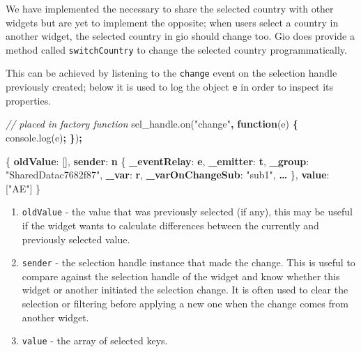 \documentclass[
  10pt,
]{krantz}
\makeatletter
\newenvironment{Shaded}{\begin{snugshade}}{\end{snugshade}}
\newcommand{\AttributeTok}[1]{\textcolor[rgb]{0.61,0.61,0.61}{#1}}
\newcommand{\CommentTok}[1]{\textcolor[rgb]{0.37,0.37,0.37}{\textit{#1}}}
\newcommand{\ErrorTok}[1]{\textcolor[rgb]{0.14,0.14,0.14}{\textbf{#1}}}
\newcommand{\FunctionTok}[1]{\textcolor[rgb]{0,0,0}{#1}}
\newcommand{\KeywordTok}[1]{\textcolor[rgb]{0.27,0.27,0.27}{\textbf{#1}}}
\newcommand{\NormalTok}[1]{#1}
\newcommand{\OperatorTok}[1]{\textcolor[rgb]{0.43,0.43,0.43}{\textbf{#1}}}
\newcommand{\OtherTok}[1]{\textcolor[rgb]{0.37,0.37,0.37}{#1}}
\newcommand{\StringTok}[1]{\textcolor[rgb]{0.5,0.5,0.5}{#1}}
\newcommand{\VariableTok}[1]{\textcolor[rgb]{0,0,0}{#1}}
\providecommand{\tightlist}{%
  \setlength{\itemsep}{0pt}\setlength{\parskip}{0pt}}
\newenvironment{kframe}{%
\medskip{}
\setlength{\fboxsep}{.8em}
 \def\at@end@of@kframe{}%
 \ifinner\ifhmode%
  \def\at@end@of@kframe{\end{minipage}}%
  \begin{minipage}{\columnwidth}%
 \fi\fi%
 \def\FrameCommand##1{\hskip\@totalleftmargin \hskip-\fboxsep
 \colorbox{shadecolor}{##1}\hskip-\fboxsep
     \hskip-\linewidth \hskip-\@totalleftmargin \hskip\columnwidth}%
 \MakeFramed {\advance\hsize-\width
   \@totalleftmargin\z@ \linewidth\hsize
   \@setminipage}}%
 {\par\unskip\endMakeFramed%
 \at@end@of@kframe}
\renewenvironment{Shaded}{\begin{kframe}}{\end{kframe}}
\makeatother
\begin{document}
We have implemented the necessary to share the selected country with other widgets but are yet to implement the opposite; when users select a country in another widget, the selected country in gio should change too. Gio does provide a method called \texttt{switchCountry} to change the selected country programmatically.

This can be achieved by listening to the \texttt{change} event on the selection handle previously created; below it is used to log the object \texttt{e} in order to inspect its properties.

\begin{Shaded}
\begin{Highlighting}[]
\CommentTok{// placed in factory function}
\VariableTok{sel\_handle}\NormalTok{.}\AttributeTok{on}\NormalTok{(}\StringTok{"change"}\OperatorTok{,} \KeywordTok{function}\NormalTok{(e) }\OperatorTok{\{}
  \VariableTok{console}\NormalTok{.}\AttributeTok{log}\NormalTok{(e)}\OperatorTok{;}
\OperatorTok{\}}\NormalTok{)}\OperatorTok{;}
\end{Highlighting}
\end{Shaded}

\begin{Shaded}
\begin{Highlighting}[]
\FunctionTok{\{}
  \ErrorTok{oldValue}\FunctionTok{:} \OtherTok{[]}\FunctionTok{,}
  \ErrorTok{sender}\FunctionTok{:} \ErrorTok{n} \FunctionTok{\{}
    \ErrorTok{\_eventRelay}\FunctionTok{:} \ErrorTok{e}\FunctionTok{,} 
    \ErrorTok{\_emitter}\FunctionTok{:} \ErrorTok{t}\FunctionTok{,} 
    \ErrorTok{\_group}\FunctionTok{:} \StringTok{"SharedDatac7682f87"}\FunctionTok{,} 
    \ErrorTok{\_var}\FunctionTok{:} \ErrorTok{r}\FunctionTok{,} 
    \ErrorTok{\_varOnChangeSub}\FunctionTok{:} \StringTok{"sub1"}\FunctionTok{,} 
    \ErrorTok{…}
  \FunctionTok{\},}
  \ErrorTok{value}\FunctionTok{:} \OtherTok{[}\StringTok{"AE"}\OtherTok{]}
\FunctionTok{\}}
\end{Highlighting}
\end{Shaded}

\begin{enumerate}
\def\labelenumi{\arabic{enumi}.}
\tightlist
\item
  \texttt{oldValue} - the value that was previously selected (if any), this may be useful if the widget wants to calculate differences between the currently and previously selected value.
\item
  \texttt{sender} - the selection handle instance that made the change. This is useful to compare against the selection handle of the widget and know whether this widget or another initiated the selection change. It is often used to clear the selection or filtering before applying a new one when the change comes from another widget.
\item
  \texttt{value} - the array of selected keys.
\end{enumerate}
\end{document}
